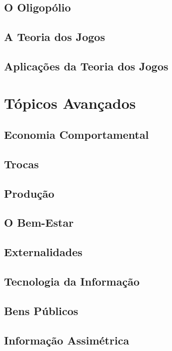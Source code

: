 \documentclass[a4paper,11pt,oneside]{book}
\theoremstyle{definition}
\theoremstyle{break}
\begin{document}
\chapter{O Oligopólio}

\chapter{A Teoria dos Jogos}

\chapter{Aplicações da Teoria dos Jogos}

\part{Tópicos Avançados}

\chapter{Economia Comportamental}

\chapter{Trocas}

\chapter{Produção}

\chapter{O Bem-Estar}

\chapter{Externalidades}

\chapter{Tecnologia da Informação}

\chapter{Bens Públicos}

\chapter{Informação Assimétrica}
\end{document}

